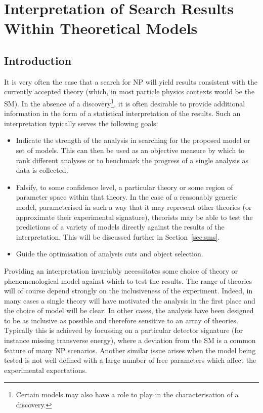 \chapter{Interpretation of Search Results Within Theoretical Models}
\label{sec:interpretation}
\section{Introduction}
It is very often the case that a search for \ac{NP} will yield results
consistent with the currently accepted theory (which, in most particle physics
contexts would be the \ac{SM}). In the absence of a discovery\footnote{Certain
  models may also have a role to play in the characterisation of a discovery.},
it is often desirable to provide additional information in the form of a
statistical interpretation of the results. Such an interpretation typically
serves the following goals:
\begin{itemize}
\item Indicate the strength of the analysis in searching for the proposed model
  or set of models. This can then be used as an objective measure by which to
  rank different analyses or to benchmark the progress of a single analysis as
  data is collected.
\item Falsify, to some confidence level, a particular theory or some region of
  parameter space within that theory. In the case of a reasonably generic model,
  parameterised in such a way that it may represent other theories (or
  approximate their experimental signature), theorists may be able to
  test the predictions of a variety of models directly against the results of
  the interpretation. This will be discussed further in Section~\ref{sec:sms}.
\item Guide the optimisation of analysis cuts and object selection.
\end{itemize}

Providing an interpretation invariably necessitates some choice of theory or
phenomenological model against which to test the results. The range of theories
will of course depend strongly on the inclusiveness of the experiment. Indeed,
in many cases a single theory will have motivated the analysis in the first
place and the choice of model will be clear. In other cases, the analysis have
been designed to be as inclusive as possible and therefore sensitive to an array
of theories. Typically this is achieved by focussing on a particular detector
signature (for instance missing transverse energy), where a deviation from the
\ac{SM} is a common feature of many \ac{NP} scenarios. Another similar issue
arises when the model being tested is not well defined with a large number of
free parameters which affect the experimental expectations.

